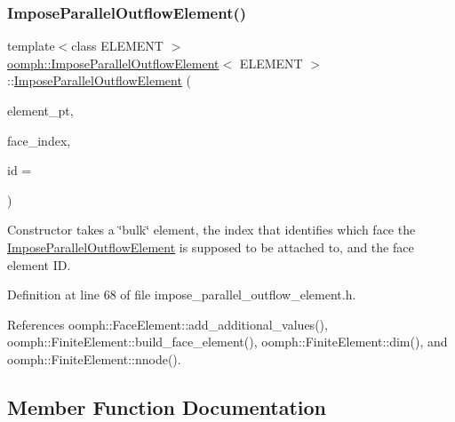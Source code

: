 \subsubsection{\texorpdfstring{Impose\+Parallel\+Outflow\+Element()}{ImposeParallelOutflowElement()}}
{\footnotesize\ttfamily template$<$class E\+L\+E\+M\+E\+NT $>$ \\
\hyperlink{classoomph_1_1ImposeParallelOutflowElement}{oomph\+::\+Impose\+Parallel\+Outflow\+Element}$<$ E\+L\+E\+M\+E\+NT $>$\+::\hyperlink{classoomph_1_1ImposeParallelOutflowElement}{Impose\+Parallel\+Outflow\+Element} (\begin{DoxyParamCaption}\item[{\hyperlink{classoomph_1_1FiniteElement}{Finite\+Element} $\ast$const \&}]{element\+\_\+pt,  }\item[{const int \&}]{face\+\_\+index,  }\item[{const unsigned \&}]{id = {} }\end{DoxyParamCaption})\hspace{0.3cm}{\ttfamily [inline]}}



Constructor takes a \char`\"{}bulk\char`\"{} element, the index that identifies which face the \hyperlink{classoomph_1_1ImposeParallelOutflowElement}{Impose\+Parallel\+Outflow\+Element} is supposed to be attached to, and the face element ID. 



Definition at line 68 of file impose\+\_\+parallel\+\_\+outflow\+\_\+element.\+h.



References oomph\+::\+Face\+Element\+::add\+\_\+additional\+\_\+values(), oomph\+::\+Finite\+Element\+::build\+\_\+face\+\_\+element(), oomph\+::\+Finite\+Element\+::dim(), and oomph\+::\+Finite\+Element\+::nnode().



\subsection{Member Function Documentation}
\mbox{\label{classoomph_1_1ImposeParallelOutflowElement_aa299d5f5aa5184db817b4219665c77ed}} 
